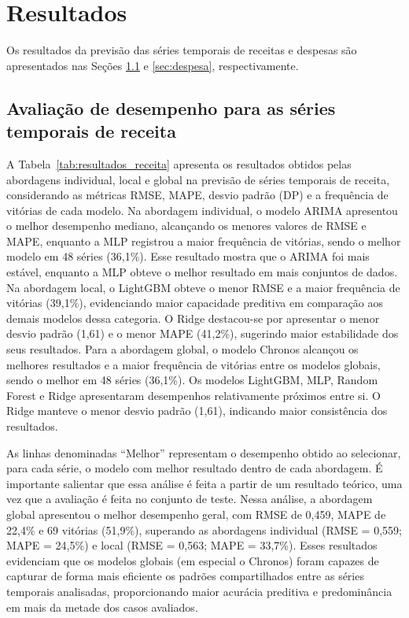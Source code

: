 \documentclass[12pt]{article}
\begin{document}
\section{Resultados}\label{sec:resultados}

Os resultados da previsão das séries temporais de receitas e despesas são apresentados nas Seções \ref{sec:receita} e \ref{sec:despesa}, respectivamente.

\subsection{Avaliação de desempenho para as séries temporais de receita}\label{sec:receita}

A Tabela~\ref{tab:resultados_receita} apresenta os resultados obtidos pelas abordagens individual, local e global na previsão de séries temporais de receita, considerando as métricas RMSE, MAPE, desvio padrão (DP) e a frequência de vitórias de cada modelo. Na abordagem individual, o modelo ARIMA apresentou o melhor desempenho mediano, alcançando os menores valores de RMSE e MAPE, enquanto a MLP registrou a maior frequência de vitórias, sendo o melhor modelo em 48 séries (36,1\%). Esse resultado mostra que o ARIMA foi mais estável, enquanto a MLP obteve o melhor resultado em mais conjuntos de dados. Na abordagem local, o LightGBM obteve o menor RMSE e a maior frequência de vitórias (39,1\%), evidenciando maior capacidade preditiva em comparação aos demais modelos dessa categoria. O Ridge destacou-se por apresentar o menor desvio padrão (1,61) e o menor MAPE (41,2\%), sugerindo maior estabilidade dos seus resultados. Para a abordagem global, o modelo Chronos alcançou os melhores resultados e a maior frequência de vitórias entre os modelos globais, sendo o melhor em 48 séries (36,1\%). Os modelos LightGBM, MLP, Random Forest e Ridge apresentaram desempenhos relativamente próximos entre si. O Ridge manteve o menor desvio padrão (1,61), indicando maior consistência dos resultados.

As linhas denominadas ``Melhor'' representam o desempenho obtido ao selecionar, para cada série, o modelo com melhor resultado dentro de cada abordagem. É importante salientar que essa análise é feita a partir de um resultado teórico, uma vez que a avaliação é feita no conjunto de teste. Nessa análise, a abordagem global apresentou o melhor desempenho geral, com RMSE de 0,459, MAPE de 22,4\% e 69 vitórias (51,9\%), superando as abordagens individual (RMSE = 0,559; MAPE = 24,5\%) e local (RMSE = 0,563; MAPE = 33,7\%). Esses resultados evidenciam que os modelos globais (em especial o Chronos) foram capazes de capturar de forma mais eficiente os padrões compartilhados entre as séries temporais analisadas, proporcionando maior acurácia preditiva e predominância em mais da metade dos casos avaliados.
\end{document}
